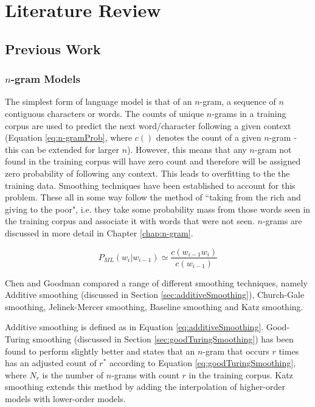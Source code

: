 \chapter{Literature Review}\label{chap:literatureReview}


\section{Previous Work}

\subsection{$n$-gram Models}

The simplest form of language model is that of an $n$-gram, a sequence of $n$ contiguous characters or words. The counts of unique $n$-grams in a training corpus are used to predict the next word/character following a given context (Equation \ref{eq:n-gramProb}, where $c()$ denotes the count of a given $n$-gram - this can be extended for larger $n$). However, this means that any $n$-gram not found in the training corpus will have zero count and therefore will be assigned zero probability of following any context. This leads to overfitting to the the training data. Smoothing techniques have been established to account for this problem. These all in some way follow the method of ``taking from the rich and giving to the poor", i.e. they take some probability mass from those words seen in the training corpus and associate it with words that were not seen. $n$-grams are discussed in more detail in Chapter \ref{chap:n-gram}. 

\begin{equation}
P_{ML}(w_{i}|w_{i-1})\simeq\frac{c(w_{i-1}w_{i})}{c(w_{i-1})}
\label{eq:n-gramProb}
\end{equation}


Chen and Goodman \cite{chen1996empirical} \cite{chen1999empirical} compared a range of different smoothing techniques, namely Additive smoothing (discussed in Section \ref{sec:additiveSmoothing}), Church-Gale smoothing, Jelinek-Mercer smoothing, Baseline smoothing and Katz smoothing.  

Additive smoothing is defined as in Equation \ref{eq:additiveSmoothing}. Good-Turing smoothing (discussed in Section \ref{sec:goodTuringSmoothing}) has been found to perform slightly better and states that an $n$-gram that occurs $r$ times has an adjusted count of $r^{*}$ according to Equation \ref{eq:goodTuringSmoothing}, where $N_{r}$ is the number of $n$-grams with count $r$ in the training corpus. Katz smoothing extends this method by adding the interpolation of higher-order models with lower-order models. 

